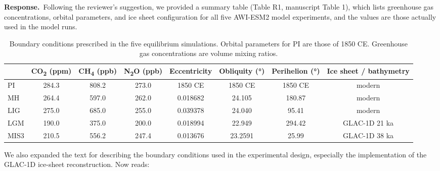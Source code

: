 \documentclass[11pt,a4paper]{article}
\newcommand{\response}{\par\noindent\color{chgcol}\textbf{Response.}\ }
\begin{document}
\response Following the reviewer’s suggestion, we provided a summary table (Table R1, manuscript Table 1), which lists greenhouse gas concentrations, orbital parameters, and ice sheet configuration for all five AWI-ESM2 model experiments, and the values are those actually used in the model runs.

\begin{table}[h!]
\caption{Boundary conditions prescribed in the five equilibrium simulations. Orbital parameters for PI are those of 1850 CE. Greenhouse gas concentrations are volume mixing ratios.}
\label{tR:bc}
\centering\footnotesize\setlength{\tabcolsep}{3.5pt}
\begin{tabular}{lccccccc}
\toprule
 & CO\textsubscript{2} (ppm) & CH\textsubscript{4} (ppb) & N\textsubscript{2}O (ppb) & Eccentricity & Obliquity (°) & Perihelion (°) & Ice sheet / bathymetry \\
\midrule
PI & 284.3 & 808.2 & 273.0 & 1850 CE & 1850 CE & 1850 CE & modern \\
MH & 264.4 & 597.0 & 262.0 & 0.018682 & 24.105 & 180.87 & modern \\
LIG & 275.0 & 685.0 & 255.0 & 0.039378 & 24.040 & 95.41 & modern \\
LGM & 190.0 & 375.0 & 200.0 & 0.018994 & 22.949 & 294.42 & GLAC-1D 21 ka \\
MIS3 & 210.5 & 556.2 & 247.4 & 0.013676 & 23.2591 & 25.99 & GLAC-1D 38 ka \\
\bottomrule
\end{tabular}
\end{table}

We also expanded the text for describing the boundary conditions used in the experimental design, especially the implementation of the GLAC-1D ice-sheet reconstruction. Now reads:
\end{document}
